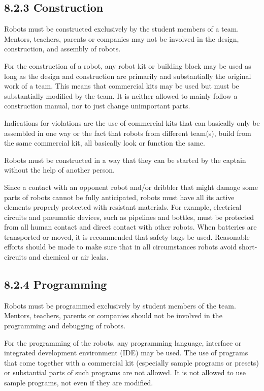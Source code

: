 \documentclass{article}
\begin{document}
\subsection{\textcolor{color-5}{8}.2.3 Construction \label{ref-057}}

Robots must be constructed exclusively by the student members of a team. Mentors, teachers, parents or companies may not be involved in the design, construction, and assembly of robots. 

\textcolor{color-5}{For the construction of a robot, any robot kit or building block may be used as long as the design and construction are primarily and substantially the original work of a team. This means that commercial kits may be used but must be substantially modified by the team. It is neither allowed to mainly follow a construction manual, nor to just change unimportant parts.} 

Indications for violations are the use of commercial kits that can basically only be assembled in one way or the fact that robots from different team(s), build from the same commercial kit, all basically look or function the same.

Robots must be constructed in a way that they can be started by the captain without the help of another person. 

Since a contact with an opponent robot and/or dribbler that might damage some parts of robots cannot be fully anticipated, robots must have all its active elements properly protected with resistant materials. For example, electrical circuits and pneumatic devices, such as pipelines and bottles, must be protected from all human contact and direct contact with other robots. When batteries are transported or moved, it is recommended that safety bags be used. Reasonable efforts should be made to make sure that in all circumstances robots avoid short-circuits and chemical or air leaks. 

\subsection{8.2.4 Programming \label{ref-058}}

Robots must be programmed exclusively by student members of the team. Mentors, teachers, parents or companies should not be involved in the programming and debugging of robots. 

For the programming of the robots, any programming language, interface or integrated development environment (IDE) may be used. The use of programs that come together with a commercial kit (especially sample programs or presets) or substantial parts of such programs are not allowed. It is not allowed to use sample programs, not even if they are modified. 
\end{document}
